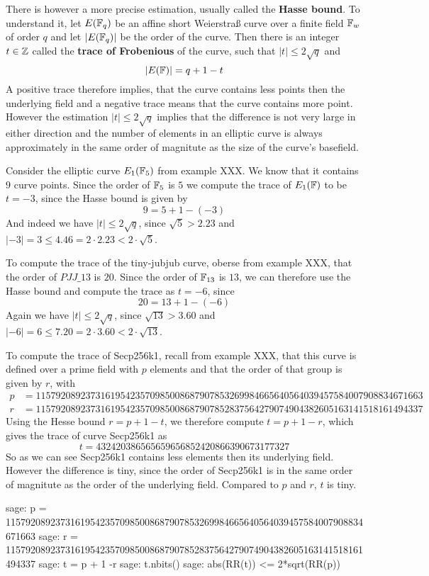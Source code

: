 There is however a more precise estimation, usually called the \textbf{Hasse bound}. To understand it, let $E(\mathbb{F}_q)$ be an affine short Weierstraß curve over a finite field $\mathbb{F}_w$ of order $q$ and let $|E(\mathbb{F}_q)|$ be the order of the curve. Then there is an integer $t\in \mathbb{Z}$ called the \textbf{trace of Frobenious} of the curve, such that $|t| \leq 2\sqrt{q}$ and
\begin{equation}
|E(\mathbb{F})| = q +1 -t
\end{equation}
A positive trace therefore implies, that the curve contains less points then the underlying field and a negative trace means that the curve contains more point. However the estimation $|t| \leq 2\sqrt{q}$ implies that the difference is not very large in either direction and the number of elements in an elliptic curve is always approximately in the same order of magnitute as the size of the curve's basefield.
\begin{example} Consider the elliptic curve $E_1(\mathbb{F}_5)$ from example XXX. We know that it contains $9$ curve points. Since the order of $\mathbb{F}_5$ is $5$ we compute the trace of $E_1(\mathbb{F})$ to be $t=-3$, since the Hasse bound is given by
$$
9 = 5 + 1 - (-3)
$$
And indeed we have $|t| \leq 2\sqrt{q}$, since $\sqrt{5}> 2.23$ and
$|-3|= 3 \leq 4.46 = 2\cdot 2.23< 2\cdot \sqrt{5}$.
\end{example}
\begin{example} To compute the trace of the tiny-jubjub curve, oberse from example XXX, that the order of $\mathit{PJJ\_13}$ is $20$. Since the order of $\mathbb{F}_{13}$ is $13$, we can therefore use the Hasse bound and compute the trace as $t=-6$, since
$$
20 = 13 + 1 - (-6)
$$
Again we have $|t| \leq 2\sqrt{q}$, since $\sqrt{13}> 3.60$ and
$|-6|= 6 \leq 7.20 = 2\cdot 3.60< 2\cdot \sqrt{13}$.
\end{example}
\begin{example}To compute the trace of Secp256k1, recall from example XXX, that this curve is defined over a prime field with $p$ elements and that the order of that group is given by $r$, with
\begin{align*}
p &= \scriptstyle 115792089237316195423570985008687907853269984665640564039457584007908834671663\\
r &= \scriptstyle 115792089237316195423570985008687907852837564279074904382605163141518161494337
\end{align*}
Using the Hesse bound $r = p + 1 -t$, we therefore compute $t= p+1 -r$, which gives the trace of curve Secp256k1 as
$$
t = \scriptstyle 432420386565659656852420866390673177327
$$
So as we can see Secp256k1 contains less elements then its underlying field. However  the difference is tiny, since the order of Secp256k1 is in the same order of magnitute as the order of the underlying field. Compared to $p$ and $r$, $t$ is tiny.
\begin{sagecommandline}
sage: p = 115792089237316195423570985008687907853269984665640564039457584007908834671663
sage: r = 115792089237316195423570985008687907852837564279074904382605163141518161494337
sage: t = p + 1 -r
sage: t.nbits()
sage: abs(RR(t)) <= 2*sqrt(RR(p))
\end{sagecommandline}
\end{example}

